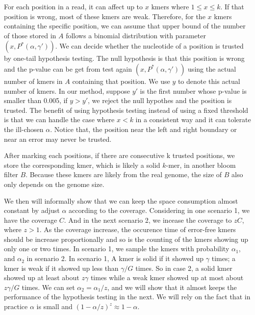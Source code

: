 \documentclass[10pt]{article}
\begin{document}
For each position in a read, it can affect up to $x$ kmers where $1\le x\le k$. If that position is wrong, most of these kmers are weak. Therefore, for the $x$ kmers containing the specific position, we can assume that upper bound of the number of those stored in $A$ follows a binomial distribution with parameter $(x,P^*(\alpha, \gamma'))$. We can decide whether the nucleotide of a position is trusted by one-tail hypothesis testing. The null hypothesis is that this position is wrong and the p-value can be get from test again $(x,P^*(\alpha, \gamma'))$ using the actual number of kmers in $A$ containing that position. We use $y$ to denote this actual number of kmers. In our method, suppose $y'$ is the first number whose p-value is smaller than 0.005, if $y>y'$, we reject the null hypothes and the position is trusted. The benefit of using hypothesis testing instead of using a fixed threshold is that we can handle the case where $x<k$ in a consistent way and it can tolerate the ill-chosen $\alpha$. Notice that, the position near the left and right boundary or near an error may never be trusted.

After marking each positions, if there are consecutive k trusted positions, we store the corresponding kmer, which is likely a solid $k$-mer, in another bloom filter $B$. Because these kmers are likely from the real genome, the size of $B$ also only depends on the genome size. 

We then will informally show that we can keep the space consumption almost constant by adjust $\alpha$ according to the coverage. Considering in one scenario 1, we have the coverage $C$. And in the next scenario 2, we incease the coverage to $zC$, where $z>1$. As the coverage increase, the occurence time of error-free kmers should be increase proportionally and so is the counting of the kmers showing up only one or two times. In scenario 1, we sample the kmers with probability $\alpha_1$, and $\alpha_2$ in scenario 2. In scenario 1, A kmer is solid if it showed up $\gamma$ times; a kmer is weak if it showed up less than $\gamma/G$ times. So in case 2, a solid kmer showed up at least about $z\gamma$ times while a weak kmer showed up at most about $z\gamma/G$ times. We can set $\alpha_2=\alpha_1/z$, and we will show that it almost keeps the performance of the hypothesis testing in the next. We will rely on the fact that in practice $\alpha$ is small and $(1-\alpha/z)^z\approx 1-\alpha$.
\end{document}

